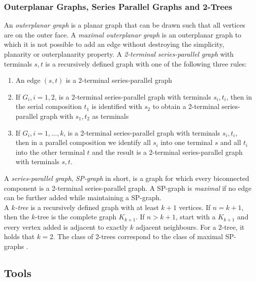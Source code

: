 \subsubsection{Outerplanar Graphs, Series Parallel Graphs and 2-Trees}
An \emph{outerplanar graph} is a planar graph that can be drawn such that all vertices are on the outer face. A \emph{maximal outerplanar graph} is an outerplanar graph to which it is not possible to add an edge without destroying the simplicity, planarity or outerplanarity property. 
A \emph{2-terminal series-parallel graph} with terminals $s,t$ is a recursively defined graph with one of the following three rules:
\begin{enumerate}
	\item An edge $(s,t)$ is a 2-terminal series-parallel graph
	\item If $G_i, i = 1,2$, is a 2-terminal series-parallel graph with terminals $s_i,t_i$, then in the serial composition $t_1$ is identified with $s_2$ to obtain a 2-terminal series-parallel graph with $s_1,t_2$ as terminals
	\item If $G_i, i=1,...,k$, is a 2-terminal series-parallel graph with terminals $s_i,t_i$, then in a parallel composition we identify all $s_i$ into one terminal $s$ and all $t_i$ into the other terminal $t$ and the result is a 2-terminal series-parallel graph with terminals $s,t$.
\end{enumerate}
A \emph{series-parallel graph}, \emph{SP-graph} in short, is a graph for which every biconnected component is a 2-terminal series-parallel graph. A SP-graph is \emph{maximal} if no edge can be further added while maintaining a SP-graph. \cite[P. 143ff]{Biedl_SP}\\
A \emph{$k$-tree} is a recursively defined graph with at least $k+1$ vertices. If $n = k+1$, then the $k$-tree is the complete graph $K_{k+1}$. If $n>{k+1}$, start with a $K_{k+1}$ and every vertex added is adjacent to exactly $k$ adjacent neighbours. For a $2$-tree, it holds that $k=2$. The class of 2-trees correspond to the class of maximal SP-graphs \cite[Page 2]{straight-line_2-trees}.
\subsection{Tools}
